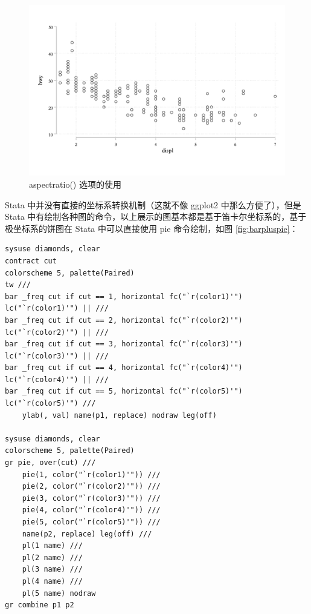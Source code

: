 \begin{figure}[htbp]
  \centering \includegraphics[width=\textwidth]{assets/aspscatter.png}
  \caption{aspectratio() 选项的使用}\label{fig:aspscatter}
\end{figure}

Stata 中并没有直接的坐标系转换机制（这就不像 ggplot2 中那么方便了），但是 Stata 中有绘制各种图的命令，以上展示的图基本都是基于笛卡尔坐标系的，基于极坐标系的饼图在 Stata 中可以直接使用 pie 命令绘制，如图 \ref{fig:barpluspie}：

\begin{lstlisting}
sysuse diamonds, clear
contract cut
colorscheme 5, palette(Paired)
tw ///
bar _freq cut if cut == 1, horizontal fc("`r(color1)'") lc("`r(color1)'") || ///
bar _freq cut if cut == 2, horizontal fc("`r(color2)'") lc("`r(color2)'") || ///
bar _freq cut if cut == 3, horizontal fc("`r(color3)'") lc("`r(color3)'") || ///
bar _freq cut if cut == 4, horizontal fc("`r(color4)'") lc("`r(color4)'") || ///
bar _freq cut if cut == 5, horizontal fc("`r(color5)'") lc("`r(color5)'") ///
    ylab(, val) name(p1, replace) nodraw leg(off)

sysuse diamonds, clear
colorscheme 5, palette(Paired)
gr pie, over(cut) ///
    pie(1, color("`r(color1)'")) ///
    pie(2, color("`r(color2)'")) ///
    pie(3, color("`r(color3)'")) ///
    pie(4, color("`r(color4)'")) ///
    pie(5, color("`r(color5)'")) ///
    name(p2, replace) leg(off) ///
    pl(1 name) ///
    pl(2 name) ///
    pl(3 name) ///
    pl(4 name) ///
    pl(5 name) nodraw
gr combine p1 p2
\end{lstlisting}

